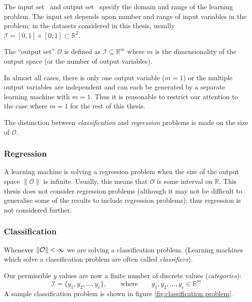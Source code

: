 The input set \calI\ and output set \calO\ specify the domain and
range of the learning problem.  The input set depends upon number and
range of input variables in the problem; in the datasets considered in
this thesis, usually $\mathcal{I} = [0,1] \times [0,1] \subset
\mathbb{R}^2$.

The ``output set'' $\mathcal{O}$ is defined as $\mathcal{I} \subseteq
\mathbb{R}^m$ where $m$ is the dimensionality of the output space (or
the number of output variables).

In almost all cases, there is only one output variable ($m=1$) or the
multiple output variables are independent and can each
be generated by a separate learning machine with $m=1$.
Thus it is reasonable to restrict our attention to the case where
$m=1$ for the rest of this thesis.

The distinction between \emph{classification} and \emph{regression}
problems is made on the size of $\mathcal{O}$.


\subsubsection{Regression}
\label{sec:regression}

A learning machine is solving a regression problem when the size of
the output space $\|\mathcal{O}\|$ is infinite.  Usually, this means
that $\mathcal{O}$ is some interval on $\mathbb{R}$.  This thesis does
not consider regression problems (although it may not be difficult to 
generalise some of the results to include regression problems); thus
regression is not considered further.


\subsubsection{Classification}
\label{sec:classification}

Whenever $\|\mathcal{O}\| < \infty$ we are solving a classification
problem.  (Learning machines which solve a classification problem are
often called \emph{classifiers}).

Our permissible $y$ values are now a finite number of discrete values
(\emph{categories}): 
%
\begin{equation}
\mathcal{I} = \{y_1, y_2, \ldots, y_c\}, \qquad \mbox{where} \qquad y_1, y_2,
\ldots, y_c \in \mathbb{R}^m
\end{equation}
%
A sample classification problem is shown in
figure \ref{fig:classification problem}.

